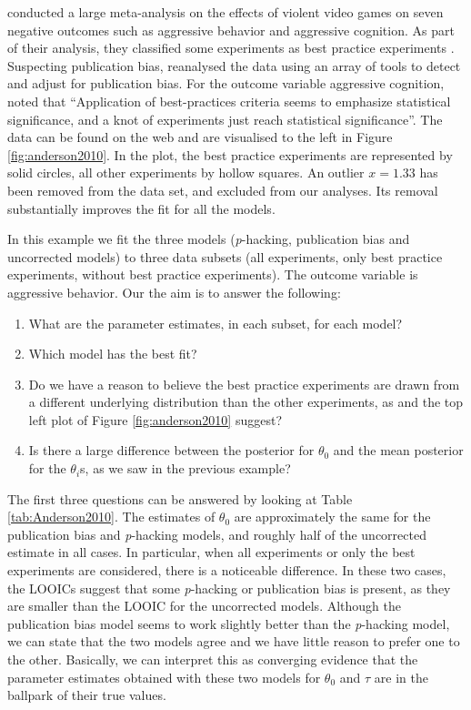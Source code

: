 \documentclass[useAMS,usenatbib,referee]{biom}
\begin{document}
\citet{anderson2010violent} conducted a large meta-analysis on the effects of violent video games on seven negative outcomes such as aggressive behavior and aggressive cognition. As part of their analysis, they classified some experiments as best practice experiments \citep[for more details, see Table 2 of][]{anderson2010violent}. Suspecting publication bias, \citet{hilgard2017overstated} reanalysed the data using an array of tools to detect and adjust for publication bias. For the outcome variable aggressive cognition, \citet{hilgard2017overstated} noted that \enquote{Application of best-practices criteria seems to emphasize statistical significance, and a knot of experiments just reach statistical significance}. The data can be found on the web \citep{Hilgard2017} and are visualised to the left in Figure \ref{fig:anderson2010}. In the plot, the best practice experiments are represented by solid circles, all other experiments by hollow squares. An outlier $x=1.33$ has been removed from the data set, and excluded from our analyses. Its removal substantially improves the fit for all the models. 

In this example we fit the three models (\textit{p}-hacking, publication bias and uncorrected models) to three data subsets (all experiments, only best practice experiments, without best practice experiments). The outcome variable is aggressive behavior. Our the aim is to answer the following:
\begin{enumerate}
\item What are the parameter estimates, in each subset, for each model?
\item Which model has the best fit?
\item Do we have a reason to believe the best practice experiments are drawn from a different underlying distribution than the other experiments, as \citet{hilgard2017overstated} and the top left plot of Figure \ref{fig:anderson2010} suggest?
\item Is there a large difference between the posterior for $\theta_{0}$ and the mean posterior for the $\theta_{i}$s, as we saw in the previous example?
\end{enumerate}



The first three questions can be answered by looking at Table \ref{tab:Anderson2010}. The estimates of $\theta_{0}$ are approximately the same for the publication bias and \textit{p}-hacking models, and roughly half of the uncorrected estimate in all cases. In particular, when all experiments or only the best experiments are considered, there is a noticeable difference. In these two cases, the LOOICs suggest that some \textit{p}-hacking or publication bias is present, as they are smaller than the LOOIC for the uncorrected models. Although the publication bias model seems to work slightly better than the \textit{p}-hacking model, we can state that the two models agree and we have little reason to prefer one to the other. Basically, we can interpret this as converging evidence that the parameter estimates obtained with these two models for $\theta_{0}$ and $\tau$ are in the ballpark of their true values.
\end{document}
